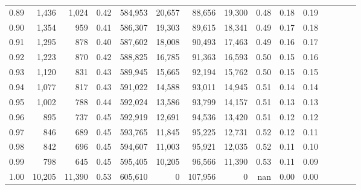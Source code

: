 \begin{tabular}{rrrcrrrrrrrrrrr}
0.89 &   1,436 &   1,024 &                                       0.42 &  584,953 &   20,657 &   88,656 &   19,300 &  0.48 &  0.18 &                         0.19 \\
0.90 &   1,354 &     959 &                                       0.41 &  586,307 &   19,303 &   89,615 &   18,341 &  0.49 &  0.17 &                         0.18 \\
0.91 &   1,295 &     878 &                                       0.40 &  587,602 &   18,008 &   90,493 &   17,463 &  0.49 &  0.16 &                         0.17 \\
0.92 &   1,223 &     870 &                                       0.42 &  588,825 &   16,785 &   91,363 &   16,593 &  0.50 &  0.15 &                         0.16 \\
0.93 &   1,120 &     831 &                                       0.43 &  589,945 &   15,665 &   92,194 &   15,762 &  0.50 &  0.15 &                         0.15 \\
0.94 &   1,077 &     817 &                                       0.43 &  591,022 &   14,588 &   93,011 &   14,945 &  0.51 &  0.14 &                         0.14 \\
0.95 &   1,002 &     788 &                                       0.44 &  592,024 &   13,586 &   93,799 &   14,157 &  0.51 &  0.13 &                         0.13 \\
0.96 &     895 &     737 &                                       0.45 &  592,919 &   12,691 &   94,536 &   13,420 &  0.51 &  0.12 &                         0.12 \\
0.97 &     846 &     689 &                                       0.45 &  593,765 &   11,845 &   95,225 &   12,731 &  0.52 &  0.12 &                         0.11 \\
0.98 &     842 &     696 &                                       0.45 &  594,607 &   11,003 &   95,921 &   12,035 &  0.52 &  0.11 &                         0.10 \\
0.99 &     798 &     645 &                                       0.45 &  595,405 &   10,205 &   96,566 &   11,390 &  0.53 &  0.11 &                         0.09 \\
1.00 &  10,205 &  11,390 &                                       0.53 &  605,610 &        0 &  107,956 &        0 &   nan &  0.00 &                         0.00 \\
\bottomrule
\end{tabular}
